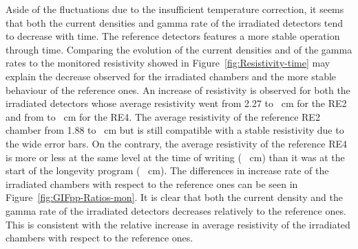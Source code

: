 	Aside of the fluctuations due to the insufficient temperature correction, it seems that both the current densities and gamma rate of the irradiated detectors tend to decrease with time. The reference detectors features a more stable operation through time. Comparing the evolution of the current densities and of the gamma rates to the monitored resistivity showed in Figure~\ref{fig:Resistivity-time} may explain the decrease observed for the irradiated chambers and the more stable behaviour of the reference ones. An increase of resistivity is observed for both the irradiated detectors whose average resistivity went from 2.27 to  \si{\Omega .cm} for the RE2 and from  to  \si{\Omega .cm} for the RE4. The average resistivity of the reference RE2 chamber from 1.88 to \si{\Omega .cm} but is still compatible with a stable  resistivity due to the wide error bars. On the contrary, the average resistivity of the reference RE4 is more or less at the same level at the time of writing ( \si{\Omega .cm}) than it was at the start of the longevity program ( \si{\Omega .cm}). The differences in increase rate of the irradiated chambers with respect to the reference ones can be seen in Figure~\ref{fig:GIFpp-Ratios-mon}. It is clear that both the current density and the gamma rate of the irradiated detectors decreases relatively to the reference ones. This is consistent with the relative increase in average resistivity of the irradiated chambers with respect to the reference ones.

